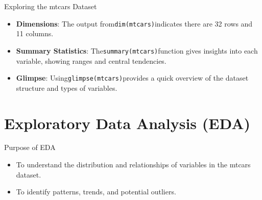 \documentclass[
  18 pt,
  ignorenonframetext,
  aspectratio=1610,
]{beamer}
\providecommand{\tightlist}{%
  \setlength{\itemsep}{0pt}\setlength{\parskip}{0pt}}\usepackage{longtable,booktabs,array}
\begin{document}
\begin{frame}[fragile]{Exploring the mtcars Dataset}
\begin{itemize}
\item
  \textbf{Dimensions}: The output from\texttt{dim(mtcars)}indicates
  there are 32 rows and 11 columns.
\item
  \textbf{Summary Statistics}: The\texttt{summary(mtcars)}function gives
  insights into each variable, showing ranges and central tendencies.
\item
  \textbf{Glimpse}: Using\texttt{glimpse(mtcars)}provides a quick
  overview of the dataset structure and types of variables.
\end{itemize}

\normalsize
\end{frame}

\hypertarget{exploratory-data-analysis-eda}{%
\section{Exploratory Data Analysis
(EDA)}\label{exploratory-data-analysis-eda}}

\begin{frame}{Purpose of EDA}
\protect\hypertarget{purpose-of-eda}{}
\begin{itemize}
\tightlist
\item
  To understand the distribution and relationships of variables in the
  mtcars dataset.
\item
  To identify patterns, trends, and potential outliers.
\end{itemize}
\end{frame}
\end{document}
